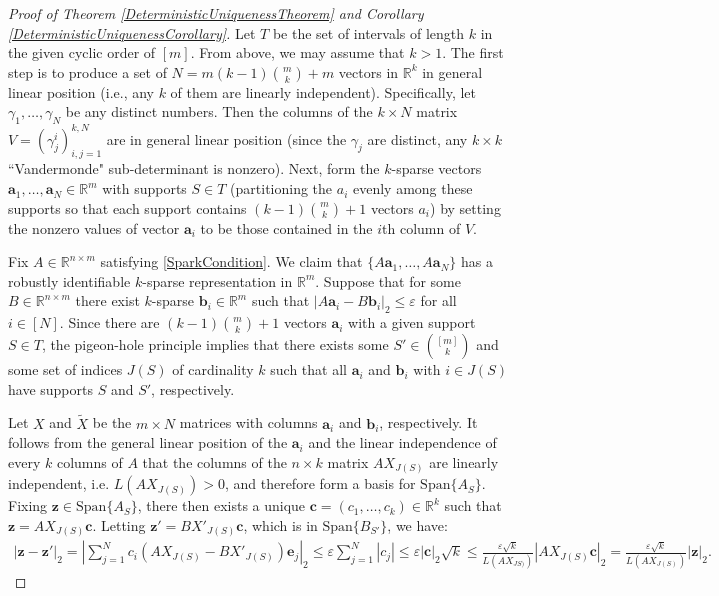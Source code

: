 \documentclass[journal, onecolumn]{IEEEtran}
\begin{document}
\begin{proof}[Proof of Theorem \ref{DeterministicUniquenessTheorem} and Corollary \ref{DeterministicUniquenessCorollary}]
Let $T$ be the set of intervals of length $k$ in the given cyclic order of $[m]$.  From above, we may assume that $k > 1$. The first step is to produce a set of $N = m(k-1){m \choose k}+m$ vectors in $\mathbb{R}^k$ in general linear position (i.e., any $k$ of them are linearly independent). Specifically, let $\gamma_1, \ldots, \gamma_N$ be any distinct numbers. Then the columns of the $k \times N$ matrix $V = (\gamma^i_j)^{k,N}_{i,j=1}$ are in general linear position (since the $\gamma_j$ are distinct, any $k \times k$ ``Vandermonde" sub-determinant is nonzero). Next, form the $k$-sparse vectors $\mathbf{a}_1, \ldots, \mathbf{a}_N \in \mathbb{R}^m$ with supports $S \in T$ (partitioning the $a_i$ evenly among these supports so that each support contains $(k-1){m \choose k}+1$ vectors $a_i$) by setting the nonzero values of vector $\mathbf{a}_i$ to be those contained in the $i$th column of $V$.

Fix $A \in \mathbb{R}^{n \times m}$ satisfying \eqref{SparkCondition}. We claim that $\{A\mathbf{a}_1, \ldots, A\mathbf{a}_N\}$ has a robustly identifiable $k$-sparse representation in $\mathbb{R}^m$. Suppose that for some $B \in \mathbb{R}^{n \times m}$ there exist $k$-sparse $\mathbf{b}_i \in \mathbb{R}^m$ such that $|A\mathbf{a}_i - B\mathbf{b}_i|_2 \leq \varepsilon$ for all $i \in [N]$. Since there are $(k-1){m \choose k}+1$ vectors $\mathbf{a}_i$ with a given support $S \in T$, the pigeon-hole principle implies that there exists some $S' \in {[m] \choose k}$ and some set of indices $J(S)$ of cardinality $k$ such that all $\mathbf{a}_i$ and $\mathbf{b}_i$ with $i \in J(S)$ 
%
%
have supports $S$ and $S'$, respectively.

Let $X$ and $\tilde{X}$ be the $m \times N$ matrices with columns $\mathbf{a}_i$ and $\mathbf{b}_i$, respectively. It follows from the general linear position of the $\mathbf{a}_i$ and the linear independence of every $k$ columns of $A$ that the columns of the $n \times k$ matrix $AX_{J(S)}$ are linearly independent, i.e. $L(AX_{J(S)}) > 0$, and therefore form a basis for $\text{Span}\{A_{S}\}$. Fixing $\mathbf{z} \in \text{Span}\{A_{S}\}$, there then exists a unique $\mathbf{c} = (c_1, \ldots, c_k) \in \mathbb{R}^k$ such that $\mathbf{z} = AX_{J(S)}\mathbf{c}$. Letting $\mathbf{z'} = BX'_{J(S)}\mathbf{c}$, which is in $\text{Span}\{B_{S'}\}$, we have:
\begin{align*}
|\mathbf{z} - \mathbf{z'}|_2 = |\sum_{j=1}^N c_i(AX_{J(S)} - BX'_{J(S)})\mathbf{e}_j|_2 
\leq \varepsilon \sum_{j=1}^N |c_j| 
\leq \varepsilon |\mathbf{c}|_2 \sqrt{k}  
\leq \frac{\varepsilon \sqrt{k}}{L(AX_{JS)})} |AX_{J(S)}\mathbf{c}|_2
= \frac{\varepsilon \sqrt{k}}{L(AX_{J(S)})} |\mathbf{z}|_2.
\end{align*}


\end{proof}
\end{document}
